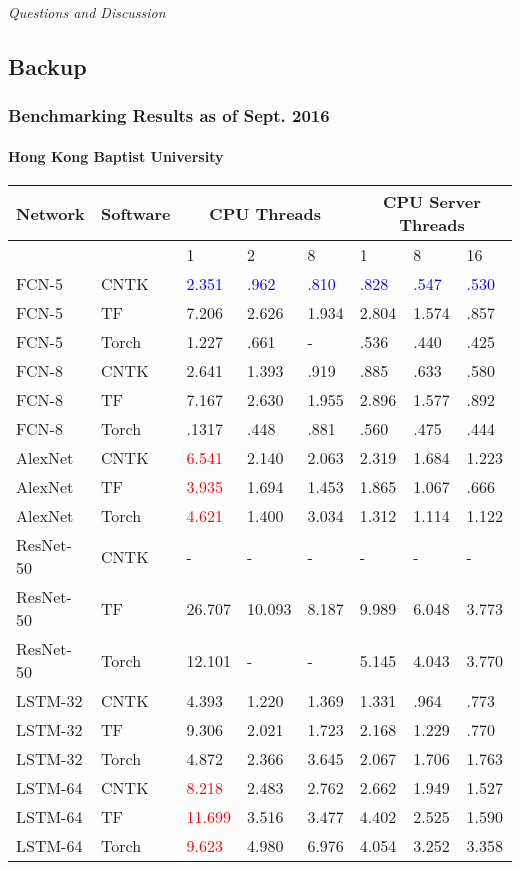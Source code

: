 \documentclass[9pt]{beamer}
\begin{document}
\begin{frame}{}
  \centering \Large
  \emph{Questions and Discussion}
\end{frame}

\subsection*{Backup}

\begin{frame}
\frametitle{Benchmarking Results as of Sept. 2016}
\framesubtitle{Hong Kong Baptist University}
\begin{table}
\small
\begin{tabular}{ |l|l|l|l|l|l|l|l| }
  \hline
Network & Software &  \multicolumn{3}{|c|}{CPU Threads} &  \multicolumn{3}{|c|}{CPU Server Threads}\\ \hline
 & & 1 & 2 & 8 & 1 & 8 & 16\\ \hline \hline
FCN-5 & CNTK & \textcolor{blue}{2.351} & \textcolor{blue}{.962} & \textcolor{blue}{.810} & \textcolor{blue}{.828} & \textcolor{blue}{.547} & \textcolor{blue}{.530}\\
FCN-5 & TF & 7.206 & 2.626 & 1.934 & 2.804 & 1.574 & .857\\
FCN-5 & Torch & 1.227 & .661 & - & .536 & .440 & .425\\ \hline
FCN-8 & CNTK & 2.641 & 1.393 & .919 & .885 & .633 & .580\\
FCN-8 & TF & 7.167 & 2.630 & 1.955 & 2.896 & 1.577 & .892\\
FCN-8 & Torch & .1317 & .448 & .881 & .560 & .475 & .444\\ \hline \hline
AlexNet & CNTK & \textcolor{red}{6.541} & 2.140 & 2.063 & 2.319 & 1.684 & 1.223\\
AlexNet & TF & \textcolor{red}{3.935} & 1.694 & 1.453 & 1.865 & 1.067 & .666\\
AlexNet & Torch & \textcolor{red}{4.621} & 1.400 & 3.034 & 1.312 & 1.114 & 1.122\\ \hline
ResNet-50 & CNTK & - & - & - & - & - & - \\
ResNet-50 & TF & 26.707 & 10.093 & 8.187 & 9.989 & 6.048 & 3.773\\
ResNet-50 & Torch & 12.101 & - & - & 5.145 & 4.043 & 3.770\\ \hline \hline
LSTM-32 & CNTK & 4.393 & 1.220 & 1.369 & 1.331 & .964 & .773\\
LSTM-32 & TF & 9.306 & 2.021 & 1.723 & 2.168 & 1.229 & .770\\
LSTM-32 & Torch & 4.872 & 2.366 & 3.645 & 2.067 & 1.706 & 1.763\\ \hline
LSTM-64 & CNTK & \textcolor{red}{8.218} & 2.483 & 2.762 & 2.662 & 1.949 & 1.527\\
LSTM-64 & TF & \textcolor{red}{11.699} & 3.516 & 3.477 & 4.402 & 2.525 & 1.590\\
LSTM-64 & Torch & \textcolor{red}{9.623} & 4.980 & 6.976 & 4.054 & 3.252 & 3.358\\ \hline 
\end{tabular}
\end{table}
\end{frame}
\end{document}
